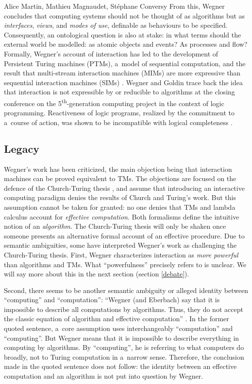 \begin{artengenv2auth}{Alice Martin, Mathieu Magnaudet, Stéphane Conversy}
From this, Wegner concludes that computing systems should not be thought of as algorithms but as \textit{interfaces}, \textit{views}, and \textit{modes of use}, definable as behaviours to be specified. Consequently, an ontological question is also at stake: in what terms should the external world be modelled: as atomic objects and events? As processes and flow?
Formally, Wegner’s account of interaction has led to the development of Persistent Turing machines (PTMs), a~model of sequential computation, and the result that multi-stream interaction machines (MIMs) are more expressive than sequential interaction machines (SIMs) \parencite{Goldin2000, Goldin2004}. Wegner and Goldin trace back the idea that interaction is not expressible by or reducible to algorithms at the closing conference on the 5\textsuperscript{th}-generation computing project in the context of logic programming. Reactiveness of logic programs, realized by the commitment to a~course of action, was shown to be incompatible with logical completeness \parencite{Wegner1999}.

\subsection{Legacy}

Wegner's work has been criticized, the main objection being that interaction machines can be proved equivalent to TMs. The objections are focused on the defence of the Church-Turing thesis \parencite{Cockshott2007, Prasse1998}, and assume that introducing an interactive computing paradigm denies the results of Church and Turing's work. But this assumption cannot be taken for granted: no one denies that TMs and lambda calculus account for \textit{effective computation}. Both formalisms define the intuitive notion of an \textit{algorithm}. The Church-Turing thesis will only be shaken once someone presents an alternative formal account of an effective procedure. Due to semantic ambiguities, some have interpreted Wegner's work as challenging the Church-Turing thesis. First, Wegner characterizes interaction as \textit{more powerful} than algorithms and TMs. What ``powerfulness'' precisely refers to is unclear. We will say more about this in the next section (section \ref{debate}).

Second, there seems to be another semantic ambiguity or alleged identity between ``computing'' and ``computation'': ``Wegner (and Eberbach) say that it is impossible to describe all computations by algorithms. Thus, they do not accept the classic equation of algorithm and effective computation'' \parencite{Cockshott2007}. In the former quoted sentence, a~core assumption uses interchangeably ``computation'' and ``computing''. But Wegner means that it is impossible to describe everything in computing by algorithms. By ``computing'', he is referring to what computers do broadly, not to Turing computation in a~narrow sense. Therefore, the conclusion made in the quoted sentence does not follow: the identity between an effective computation and an algorithm is not put into question by Wegner. 



\end{artengenv2auth}
